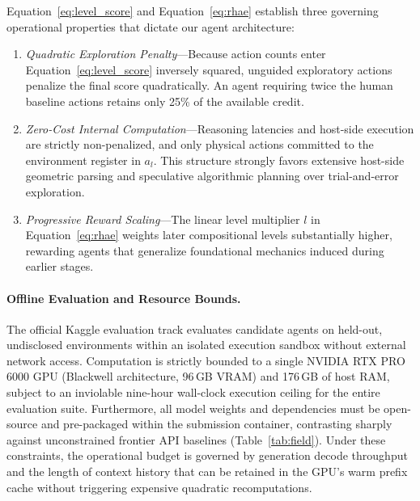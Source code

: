 Equation~\eqref{eq:level_score} and Equation~\eqref{eq:rhae} establish three governing operational properties that dictate our agent architecture:
\begin{enumerate}
    \item \emph{Quadratic Exploration Penalty}---Because action counts enter Equation~\eqref{eq:level_score} inversely squared, unguided exploratory actions penalize the final score quadratically. An agent requiring twice the human baseline actions retains only 25\% of the available credit.
    \item \emph{Zero-Cost Internal Computation}---Reasoning latencies and host-side execution are strictly non-penalized, and only physical actions committed to the environment register in $a_l$. This structure strongly favors extensive host-side geometric parsing and speculative algorithmic planning over trial-and-error exploration.
    \item \emph{Progressive Reward Scaling}---The linear level multiplier $l$ in Equation~\eqref{eq:rhae} weights later compositional levels substantially higher, rewarding agents that generalize foundational mechanics induced during earlier stages.
\end{enumerate}

\paragraph{Offline Evaluation and Resource Bounds.}
The official Kaggle evaluation track evaluates candidate agents on held-out, undisclosed environments within an isolated execution sandbox without external network access. Computation is strictly bounded to a single NVIDIA RTX PRO 6000 GPU (Blackwell architecture, 96\,GB VRAM) and 176\,GB of host RAM, subject to an inviolable nine-hour wall-clock execution ceiling for the entire evaluation suite. Furthermore, all model weights and dependencies must be open-source and pre-packaged within the submission container, contrasting sharply against unconstrained frontier API baselines (Table~\ref{tab:field}). Under these constraints, the operational budget is governed by generation decode throughput and the length of context history that can be retained in the GPU's warm prefix cache without triggering expensive quadratic recomputations.
